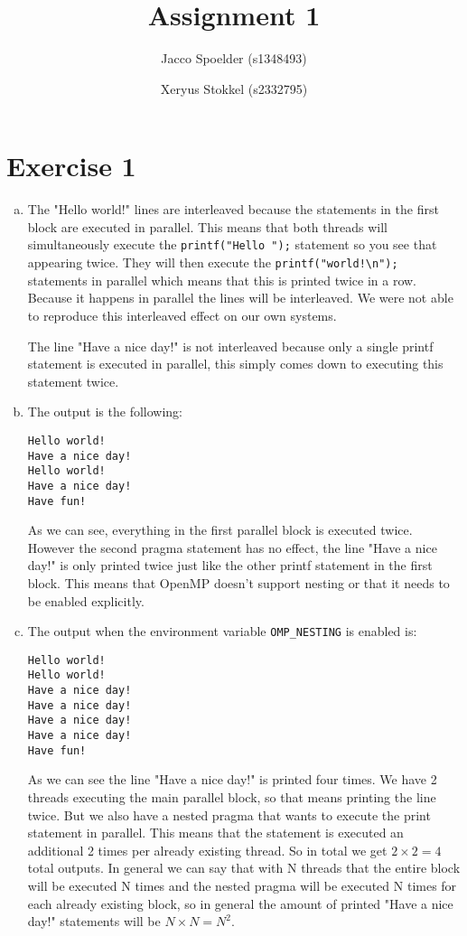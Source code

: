 \documentclass[a4paper]{article}
\title{Assignment 1}
\author{Jacco Spoelder (s1348493) \and Xeryus Stokkel (s2332795)}
\begin{document}
\maketitle

\section{Exercise 1}
\begin{enumerate}[(a)]
	\item The "Hello world!" lines are interleaved because the statements in the first block are executed in parallel. This means that both threads will simultaneously execute the \texttt{printf("Hello ");} statement so you see that appearing twice. They will then execute the \texttt{printf("world!\textbackslash n");} statements in parallel which means that this is printed twice in a row. Because it happens in parallel the lines will be interleaved. We were not able to reproduce this interleaved effect on our own systems.
	
	The line "Have a nice day!" is not interleaved because only a single printf statement is executed in parallel, this simply comes down to executing this statement twice.
	\item The output is the following:
		\begin{lstlisting}
Hello world!
Have a nice day!
Hello world!
Have a nice day!
Have fun!
		\end{lstlisting}
		As we can see, everything in the first parallel block is executed twice. However the second pragma statement has no effect, the line "Have a nice day!" is only printed twice just like the other printf statement in the first block. This means that OpenMP doesn't support nesting or that it needs to be enabled explicitly.
	\item The output when the environment variable \texttt{OMP\_NESTING} is enabled is:
		\begin{lstlisting}
Hello world!
Hello world!
Have a nice day!
Have a nice day!
Have a nice day!
Have a nice day!
Have fun!
		\end{lstlisting}
		As we can see the line "Have a nice day!" is printed four times. We have 2 threads executing the main parallel block, so that means printing the line twice. But we also have a nested pragma that wants to execute the print statement in parallel. This means that the statement is executed an additional 2 times per already existing thread. So in total we get $2 \times 2 = 4$ total outputs. In general we can say that with N threads that the entire block will be executed N times and the nested pragma will be executed N times for each already existing block, so in general the amount of printed "Have a nice day!" statements will be $N \times N = N^2$.
\end{enumerate}
\end{document}
